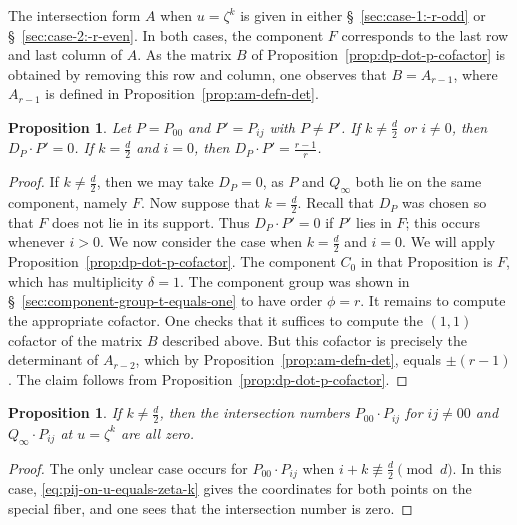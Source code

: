 \documentclass[reqno]{amsart}
\newtheorem{proposition}[thm]{Proposition}
\theoremstyle{definition}
\theoremstyle{remark}
\begin{document}
The intersection form $A$ when $u = \zeta^k$ is given in either \S~\ref{sec:case-1:-r-odd} or \S~\ref{sec:case-2:-r-even}. In both cases, the component $F$ corresponds to the last row and last column of $A$. As the matrix $B$ of Proposition~\ref{prop:dp-dot-p-cofactor} is obtained by removing this row and column, one observes that $B = A_{r-1}$, where $A_{r-1}$ is defined in Proposition~\ref{prop:am-defn-det}.

\begin{proposition}\label{prop:dp-u-zeta-k}
  Let $P = P_{00}$ and $P' = P_{ij}$ with $P \neq P'$. If $k \neq \frac{d}{2}$ or $i \neq 0$, then $D_P \cdot P' = 0$. If $k = \frac{d}{2}$ and $i = 0$, then $D_P \cdot P' = \frac{r-1}{r}$.
\end{proposition}

\begin{proof}
  If $k \neq \frac{d}{2}$, then we may take $D_P = 0$, as $P$ and $Q_\infty$ both lie on the same component, namely $F$. Now suppose that $k = \frac{d}{2}$. Recall that $D_P$ was chosen so that $F$ does not lie in its support. Thus $D_P \cdot P' = 0$ if $P'$ lies in $F$; this occurs whenever $i > 0$. We now consider the case when $k = \frac{d}{2}$ and $i = 0$. We will apply Proposition~\ref{prop:dp-dot-p-cofactor}. The component $C_0$ in that Proposition is $F$, which has multiplicity $\delta = 1$. The component group was shown in \S~\ref{sec:component-group-t-equals-one} to have order $\phi = r$. It remains to compute the appropriate cofactor. One checks that it suffices to compute the $(1,1)$ cofactor of the matrix $B$ described above. But this cofactor is precisely the determinant of $A_{r-2}$, which by Proposition~\ref{prop:am-defn-det}, equals $\pm(r-1)$. The claim follows from Proposition~\ref{prop:dp-dot-p-cofactor}.
\end{proof}

\begin{proposition}\label{prop:local-intersections-u-zeta-k}
  If $k \neq \frac{d}{2}$, then the intersection numbers $P_{00} \cdot P_{ij}$ for $ij \neq 00$ and $Q_{\infty} \cdot P_{ij}$ at $u = \zeta^k$ are all zero.
\end{proposition} 

\begin{proof}
  The only unclear case occurs for $P_{00} \cdot P_{ij}$ when $i + k \not\equiv \frac{d}{2} \pmod{d}$. In this case, \eqref{eq:pij-on-u-equals-zeta-k} gives the coordinates for both points on the special fiber, and one sees that the intersection number is zero.
\end{proof}
\end{document}
